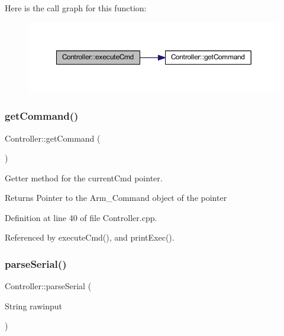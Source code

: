 Here is the call graph for this function\+:
\nopagebreak
\begin{figure}[H]
\begin{center}
\leavevmode
\includegraphics[width=350pt]{class_controller_ac1fc6cd2f507cc05e66a602e809c2446_cgraph}
\end{center}
\end{figure}
\mbox{\label{class_controller_af746c7701fda226720efe02890a308b2}} 
\subsubsection{\texorpdfstring{get\+Command()}{getCommand()}}
{\footnotesize\ttfamily Controller\+::get\+Command (\begin{DoxyParamCaption}{ }\end{DoxyParamCaption})}



Getter method for the current\+Cmd pointer. 

\begin{DoxyReturn}{Returns}
Pointer to the Arm\+\_\+\+Command object of the pointer 
\end{DoxyReturn}


Definition at line 40 of file Controller.\+cpp.



Referenced by execute\+Cmd(), and print\+Exec().

\mbox{\label{class_controller_ad7583687bca402756ed9a4a8dc2e29ee}} 
\subsubsection{\texorpdfstring{parse\+Serial()}{parseSerial()}}
{\footnotesize\ttfamily Controller\+::parse\+Serial (\begin{DoxyParamCaption}\item[{String}]{rawinput }\end{DoxyParamCaption})}



